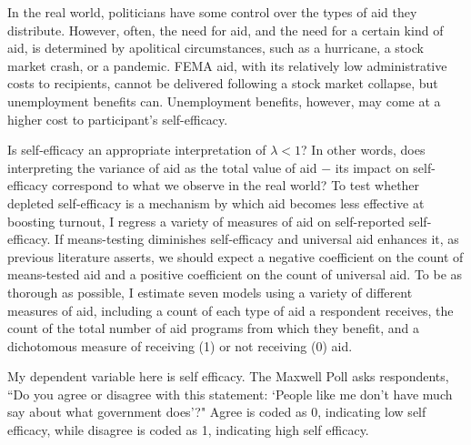 \documentclass[12pt]{paper}
\begin{document}
In the real world, politicians have some control over the types of aid they distribute. However, often, the need for aid, and the need for a certain kind of aid, is determined by apolitical circumstances, such as a hurricane, a stock market crash, or a pandemic. FEMA aid, with its relatively low administrative costs to recipients, cannot be delivered following a stock market collapse, but unemployment benefits can. Unemployment benefits, however, may come at a higher cost to participant's self-efficacy.



Is self-efficacy an appropriate interpretation of $\lambda < 1$? In other words, does interpreting the variance of aid as the total value of aid $-$ its impact on self-efficacy correspond to what we observe in the real world? To test whether depleted self-efficacy is a mechanism by which aid becomes less effective at boosting turnout, I regress a variety of measures of aid on self-reported self-efficacy. If means-testing diminishes self-efficacy and universal aid enhances it, as previous literature asserts, we should expect a negative coefficient on the count of means-tested aid and a positive coefficient on the count of universal aid. To be as thorough as possible, I estimate seven models using a variety of different measures of aid, including a count of each type of aid a respondent receives, the count of the total number of aid programs from which they benefit, and a dichotomous measure of receiving (1) or not receiving (0) aid.

My dependent variable here is self efficacy. The Maxwell Poll asks respondents, ``Do you agree or disagree with this statement: `People like me don’t have much say about what government does'?" Agree is coded as 0, indicating low self efficacy, while disagree is coded as 1, indicating high self efficacy.
\end{document}

